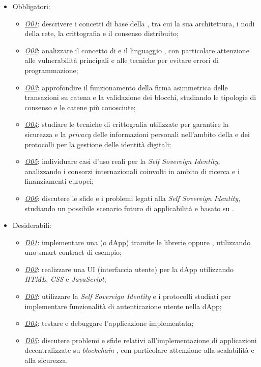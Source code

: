 \begin{itemize}

    \item Obbligatori:
        \begin{itemize}
            \item \underline{\textit{O01}}: descrivere i concetti di base della , tra cui la sua architettura, i nodi della rete, la crittografia e il consenso distribuito;
            \item \underline{\textit{O02}}: analizzare il concetto di  e il linguaggio , con particolare attenzione alle vulnerabilità principali e alle tecniche per evitare errori di programmazione;
            \item \underline{\textit{O03}}: approfondire il funzionamento della firma asimmetrica delle transazioni su catena e la validazione dei blocchi, studiando le tipologie di consenso e le catene più conosciute;
            \item \underline{\textit{O04}}: studiare le tecniche di crittografia utilizzate per garantire la sicurezza e la \textit{privacy} delle informazioni personali nell'ambito della  e dei protocolli per la gestione delle identità digitali;
            \item \underline{\textit{O05}}: individuare casi d'uso reali per la \textit{Self Sovereign Identity}, analizzando i consorzi internazionali coinvolti in ambito di ricerca e i finanziamenti europei;
            \item \underline{\textit{O06}}: discutere le sfide e i problemi legati alla \textit{Self Sovereign Identity}, studiando un possibile scenario futuro di applicabilità e basato su .
        \end{itemize}

    \item Desiderabili:
        \begin{itemize}
            \item \underline{\textit{D01}}: implementare una  (o dApp) tramite le librerie  oppure , utilizzando uno smart contract di esempio;
            \item \underline{\textit{D02}}: realizzare una UI (interfaccia utente) per la dApp utilizzando \textit{HTML}, \textit{CSS} e \textit{JavaScript};
            \item \underline{\textit{D03}}: utilizzare la \textit{Self Sovereign Identity} e i protocolli studiati per implementare funzionalità di autenticazione utente nella dApp;
            \item \underline{\textit{D04}}: testare e debuggare l'applicazione implementata;
            \item \underline{\textit{D05}}: discutere problemi e sfide relativi all'implementazione di applicazioni decentralizzate su \textit{blockchain} , con particolare attenzione alla scalabilità e alla sicurezza.
        \end{itemize}


\end{itemize}

